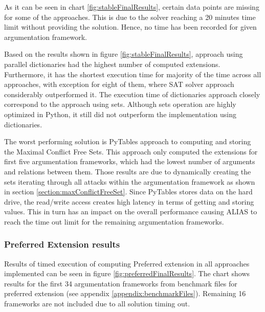 As it can be seen in chart \ref{fig:stableFinalResults}, certain data points are missing for some of the approaches. This is due to the solver reaching a 20 minutes time limit without providing the solution. Hence, no time has been recorded for given argumentation framework.

Based on the results shown in figure \ref{fig:stableFinalResults}, approach using parallel dictionaries had the highest number of computed extensions. Furthermore, it has the shortest execution time for majority of the time across all approaches, with exception for eight of them, where SAT solver approach considerably outperformed it. The execution time of dictionaries approach closely correspond to the approach using sets. Although sets operation are highly optimized in Python, it still did not outperform the implementation using dictionaries.

The worst performing solution is PyTables approach to computing and storing the Maximal Conflict Free Sets. This approach only computed the extensions for first five argumentation frameworks, which had the lowest number of arguments and relations between them. Those results are due to dynamically creating the sets iterating through all attacks within the argumentation framework as shown in section \ref{section:maxConflictFreeSet}. Since PyTables stores data on the hard drive, the read/write access creates high latency in terms of getting and storing values. This in turn has an impact on the overall performance causing ALIAS to reach the time out limit for the remaining argumentation frameworks.


\subsubsection{Preferred Extension results} \label{section:preferredExtensionResults}
Results of timed execution of computing Preferred extension in all approaches implemented can be seen in figure \ref{fig:preferredFinalResults}. The chart shows results for the first 34 argumentation frameworks from benchmark files for preferred extension (see appendix \ref{appendix:benchmarkFiles}). Remaining 16 frameworks are not included due to all solution timing out.

